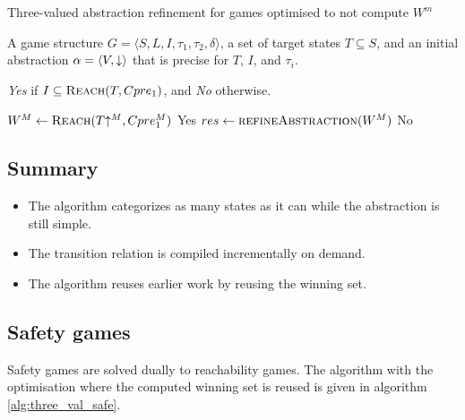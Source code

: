 \begin{algorithm}
\caption{Three-valued abstraction refinement for games optimised to not compute $W^m$}
\label{alg:opt_three_val_reach}

\begin{algorithmic}[1]

     A game structure $G = \langle S, L, I, \tau_1, \tau_2, \delta \rangle$, a set 
    of target states $T\subseteq S$, and an initial abstraction $\alpha=\langle V, \mathord{\downarrow} \rangle$
    that is precise for $T$, $I$, and $\tau_i$.

     {\it Yes} if $I \subseteq \textsc{Reach}(T, Cpre_1)$, and {\it No} otherwise.

    \Loop
        \State $W^M \gets \textsc{Reach}(T\mathord{\uparrow^M}, Cpre_1^M)$
            \State\Return Yes
        \Else       
            \State $res \gets \Call{refineAbstraction}{W^M}$
                \State\Return No
            \EndIf
        \EndIf
    \EndLoop
\end{algorithmic}
\end{algorithm}

\subsection{Summary}
\begin{itemize}
    \item The algorithm categorizes as many states as it can while the abstraction is still simple.
    \item The transition relation is compiled incrementally on demand.
    \item The algorithm reuses earlier work by reusing the winning set.
\end{itemize}

\subsection{Safety games}

Safety games are solved dually to reachability games. The algorithm with the optimisation where the computed winning set is reused is given in algorithm \ref{alg:three_val_safe}.

